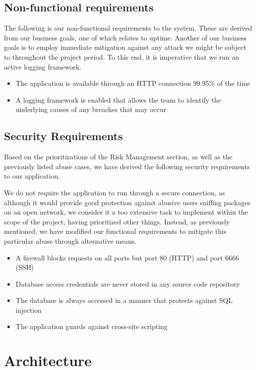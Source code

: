 \documentclass[a4paper]{article}
\begin{document}
\subsection{Non-functional requirements}
The following is our non-functional requirements to the system. These are derived from our business goals, one of which relates to uptime. Another of our business goals is to employ immediate mitigation against any attack we might be subject to throughout the project period. To this end, it is imperative that we run an active logging framework.
\begin{itemize}
\item The application is available through an HTTP connection 99.95\% of the time
\item A logging framework is enabled that allows the team to identify the underlying causes of any breaches that may occur
\end{itemize}

\subsection{Security Requirements}
Based on the prioritizations of the Risk Management section, as well as the previously listed abuse cases, we have derived the following security requirements to our application.

We do not require the application to run through a secure connection, as although it would provide good protection against abusive users sniffing packages on an open network, we consider it a too extensive task to implement within the scope of the project, having prioritized other things. Instead, as previously mentioned, we have modified our functional requirements to mitigate this particular abuse through alternative means.
\begin{itemize}
\item A firewall blocks requests on all ports but port 80 (HTTP) and port 6666 (SSH)
\item Database access credentials are never stored in any source code repository
\item The database is always accessed in a manner that protects against SQL injection
\item The application guards against cross-site scripting
\end{itemize}

\section{Architecture}
\end{document}
